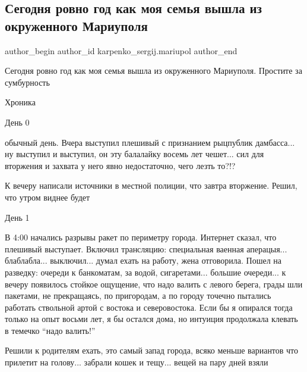  
 
 
 
 

\subsection{Сегодня ровно год как моя семья вышла из окруженного Мариуполя}
\label{sec:16_03_2023.fb.karpenko_sergij.mariupol.1.segodnya_rovno_god_k}

\ifcmt
 author_begin
   author_id karpenko_sergij.mariupol
 author_end
\fi

Сегодня ровно год как моя семья вышла из окруженного Мариуполя. Простите за сумбурность

Хроника

День 0

обычный день. Вчера выступил плешивый с признанием рыцпублик дамбасса... ну
выступил и выступил, он эту балалайку восемь лет чешет... сил для вторжения и
захвата у него явно недостаточно, чего лезть то?!?

К вечеру написали источники в местной полиции, что завтра вторжение. Решил, что
утром виднее будет

День 1

В 4:00 начались разрывы ракет по периметру города. Интернет сказал, что
плешивый выступает. Включил трансляцию: специальная ваенная аперацыя...
блаблабла... выключил... думал ехать на работу, жена отговорила. Пошел на разведку:
очереди к банкоматам, за водой, сигаретами... большие очереди... к вечеру появилось
стойкое ощущение, что надо валить с левого берега, грады шли пакетами, не
прекращаясь, по пригородам, а по городу точечно пытались работать ствольной
артой с востока и северовостока. Если бы я опирался тогда только на опыт восьми
лет, я бы остался дома, но интуиция продолжала клевать в темечко \enquote{надо валить!}

Решили к родителям ехать, это самый запад города, всяко меньше вариантов что
прилетит на голову... забрали кошек и тещу... вещей на пару дней взяли

